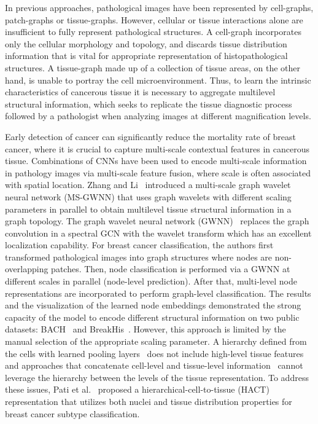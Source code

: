 In previous approaches, pathological images have been represented by cell-graphs, patch-graphs or tissue-graphs. However, cellular or tissue interactions alone are insufficient to fully represent pathological structures.
A cell-graph incorporates only the cellular morphology and topology, and discards tissue distribution information that is vital for appropriate representation of histopathological structures. A tissue-graph made up of a collection of tissue areas, on the other hand, is unable to portray the cell microenvironment.
Thus, to learn the intrinsic characteristics of cancerous tissue it is necessary to aggregate multilevel structural information, which seeks to replicate the tissue diagnostic process followed by a pathologist when analyzing images at different magnification levels.

Early detection of cancer can significantly reduce the mortality rate of breast cancer, where it is crucial to capture multi-scale contextual features in cancerous tissue. 
Combinations of CNNs have been used to encode multi-scale information in pathology images via multi-scale feature fusion, where scale is often associated with spatial location.
Zhang and Li~ introduced a multi-scale graph wavelet neural network (MS-GWNN) that uses graph wavelets with different scaling parameters in parallel to obtain multilevel tissue structural information in a graph topology. The graph wavelet neural network (GWNN)~ replaces the graph convolution in a spectral GCN with the wavelet transform which has an excellent localization capability.
For breast cancer classification, the authors first transformed pathological images into graph structures where nodes are non-overlapping patches. Then, node classification is performed via a GWNN at different scales in parallel (node-level prediction). After that, multi-level node representations are incorporated to perform graph-level classification.
The results and the visualization of the learned node embeddings demonstrated the strong capacity of the model to encode different structural information on two public datasets: BACH~ and BreakHis~. However, this approach is limited by the manual selection of the appropriate scaling parameter.
A hierarchy defined from the cells with learned pooling layers~ does not include high-level tissue features and approaches that concatenate cell-level and tissue-level information~ cannot leverage the hierarchy between the levels of the tissue representation.
To address these issues, Pati et al.~ proposed a hierarchical-cell-to-tissue (HACT) representation that utilizes both nuclei and tissue distribution properties for breast cancer subtype classification.
